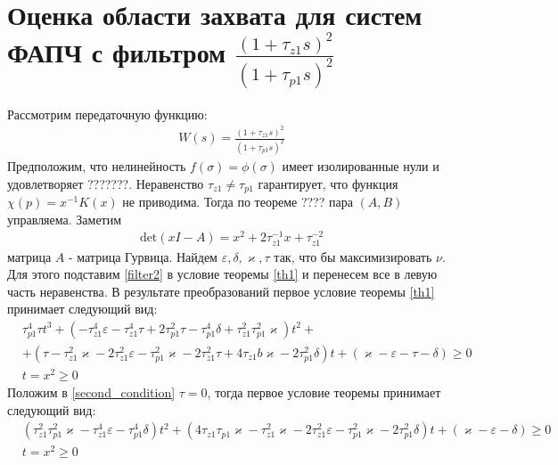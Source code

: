 \documentclass[a4paper,14pt]{extarticle} %
\begin{document}
\newpage
\section{Оценка области захвата для систем ФАПЧ с фильтром $\frac{(1+\tau_{z1}s)^2}{(1+\tau_{p1}s)^2}$}
 Рассмотрим передаточную функцию:
 \begin{equation}\label{filter2}
 \begin{aligned}
W(s) = \frac{(1+\tau_{z1}s)^2}{(1+\tau_{p1}s)^2}
 \end{aligned}
\end{equation}
Предположим, что нелинейность $f(\sigma)=\phi(\sigma)$ имеет изолированные нули и удовлетворяет ???????.
Неравенство $\tau_{z1} \neq \tau_{p1}$ гарантирует, что функция $\chi(p) = x^{-1}K(x)$ не приводима. Тогда по теореме ???? пара $(A,B)$ управляема. Заметим
 \begin{equation}
 \begin{aligned}
\text{det}(xI-A) = x^2 + 2\tau_{z1}^{-1}x + \tau_{z1}^{-2}
 \end{aligned}
\end{equation}
матрица $A$ - матрица Гурвица. Найдем $\varepsilon, \delta, \varkappa, \tau$ так, что бы максимизировать $\nu$. Для этого подставим \eqref{filter2} в условие теоремы \ref{th1} и перенесем все в левую часть неравенства. В результате преобразований первое условие теоремы \ref{th1} принимает следующий вид:
 \begin{equation}\label{second_condition}
 \begin{aligned}
&\tau_{p1}^4\tau t^3 +(- \tau_{z1}^4\varepsilon - \tau_{z1}^4\tau + 2\tau_{p1}^2\tau- \tau_{p1}^4\delta + \tau_{z1}^2\tau_{p1}^2\varkappa)t^2  +\\
&+( \tau- \tau_{z1}^2\varkappa - 2\tau_{z1}^2\varepsilon - \tau_{p1}^2\varkappa- 2\tau_{z1}^2\tau+ 4\tau_{z1}b\varkappa- 2\tau_{p1}^2\delta)t + (\varkappa-\varepsilon - \tau - \delta)  \geq 0\\
&t = x^2 \geq 0
 \end{aligned}
\end{equation}
Положим в \eqref{second_condition} $\tau = 0$, тогда первое условие теоремы принимает следующий вид:
 \begin{equation}\label{second_condition_tau_zero}
 \begin{aligned}
&(\tau_{z1}^2\tau_{p1}^2\varkappa - \tau_{z1}^4\varepsilon - \tau_{p1}^4\delta)t^2 +( 4\tau_{z1}\tau_{p1}\varkappa - \tau_{z1}^2\varkappa - 2\tau_{z1}^2\varepsilon - \tau_{p1}^2\varkappa - 2\tau_{p1}^2\delta)t + (\varkappa-\varepsilon - \delta)  \geq 0\\
&t = x^2 \geq 0
 \end{aligned}
\end{equation}
\end{document}
